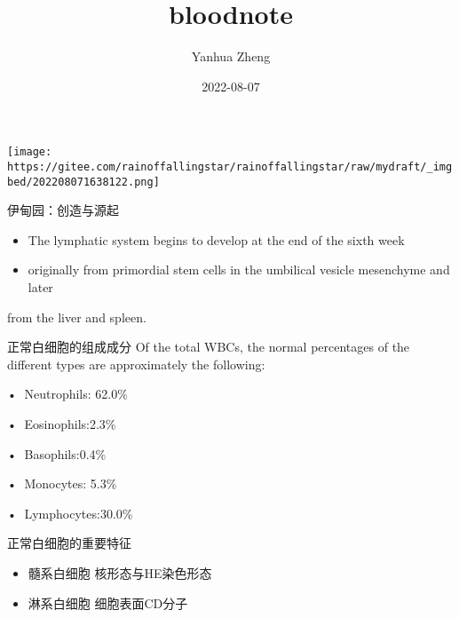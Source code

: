 \documentclass[
  ignorenonframetext,
]{beamer}
\title{bloodnote}
\author{Yanhua Zheng}
\date{2022-08-07}
\begin{document}
\frame{\titlepage}

\begin{frame}
\texttt{[image: https://gitee.com/rainoffallingstar/rainoffallingstar/raw/mydraft/\_imgbed/202208071638122.png]}
\end{frame}

\begin{frame}{伊甸园：创造与源起}
\protect\hypertarget{ux4f0aux7538ux56edux521bux9020ux4e0eux6e90ux8d77}{}
\begin{itemize}
\item
  The lymphatic system begins to develop at the end of the sixth week
\item
  originally from primordial stem cells in the umbilical vesicle
  mesenchyme and later
\end{itemize}

from the liver and spleen.
\end{frame}

\begin{frame}
\begin{block}{正常白细胞的组成成分}
\protect\hypertarget{ux6b63ux5e38ux767dux7ec6ux80deux7684ux7ec4ux6210ux6210ux5206}{}
Of the total WBCs, the normal percentages of the different types are
approximately the following:

• Neutrophils: 62.0\%

• Eosinophils:2.3\%

• Basophils:0.4\%

• Monocytes: 5.3\%

• Lymphocytes:30.0\%
\end{block}
\end{frame}

\begin{frame}
\begin{block}{正常白细胞的重要特征}
\protect\hypertarget{ux6b63ux5e38ux767dux7ec6ux80deux7684ux91cdux8981ux7279ux5f81}{}
\begin{itemize}
\item
  髓系白细胞 核形态与HE染色形态
\item
  淋系白细胞 细胞表面CD分子
\end{itemize}
\end{block}
\end{frame}
\end{document}
